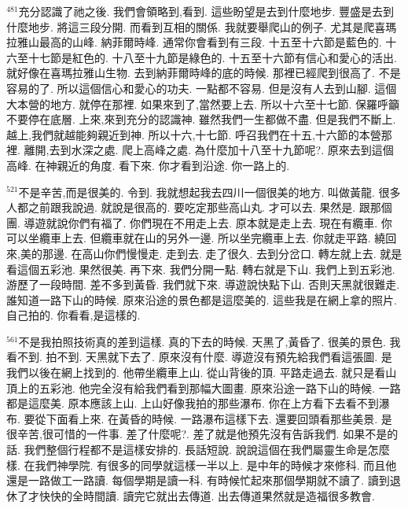\documentclass{book}
\begin{document}
$^{481}$充分認識了祂之後.
我們會領略到,看到.
這些盼望是去到什麼地步.
豐盛是去到什麼地步.
將這三段分開.
而看到互相的關係.
我就要舉爬山的例子.
尤其是爬喜瑪拉雅山最高的山峰.
納菲爾時峰.
通常你會看到有三段.
十五至十六節是藍色的.
十六至十七節是紅色的.
十八至十九節是綠色的.
十五至十六節有信心和愛心的活出.
就好像在喜瑪拉雅山生物.
去到納菲爾時峰的底的時候.
那裡已經爬到很高了.
不是容易的了.
所以這個信心和愛心的功夫.
一點都不容易.
但是沒有人去到山腳.
這個大本營的地方.
就停在那裡.
如果來到了,當然要上去.
所以十六至十七節.
保羅呼籲不要停在底層.
上來,來到充分的認識神.
雖然我們一生都做不盡.
但是我們不斷上.
越上,我們就越能夠親近到神.
所以十六,十七節.
呼召我們在十五,十六節的本營那裡.
離開,去到水深之處.
爬上高峰之處.
為什麼加十八至十九節呢?.
原來去到這個高峰.
在神親近的角度.
看下來.
你才看到沿途.
你一路上的.

$^{521}$不是辛苦,而是很美的.
令到.
我就想起我去四川一個很美的地方.
叫做黃龍.
很多人都之前跟我說過.
就說是很高的.
要吃定那些高山丸.
才可以去.
果然是.
跟那個團.
導遊就說你們有福了.
你們現在不用走上去.
原本就是走上去.
現在有纜車.
你可以坐纜車上去.
但纜車就在山的另外一邊.
所以坐完纜車上去.
你就走平路.
繞回來,美的那邊.
在高山你們慢慢走.
走到去.
走了很久.
去到分岔口.
轉左就上去.
就是看這個五彩池.
果然很美.
再下來.
我們分開一點.
轉右就是下山.
我們上到五彩池.
游歷了一段時間.
差不多到黃昏.
我們就下來.
導遊說快點下山.
否則天黑就很難走.
誰知道一路下山的時候.
原來沿途的景色都是這麼美的.
這些我是在網上拿的照片.
自己拍的.
你看看,是這樣的.

$^{561}$不是我拍照技術真的差到這樣.
真的下去的時候.
天黑了,黃昏了.
很美的景色.
我看不到.
拍不到.
天黑就下去了.
原來沒有什麼.
導遊沒有預先給我們看這張圖.
是我們以後在網上找到的.
他帶坐纜車上山.
從山背後的頂.
平路走過去.
就只是看山頂上的五彩池.
他完全沒有給我們看到那幅大圖畫.
原來沿途一路下山的時候.
一路都是這麼美.
原本應該上山.
上山好像我拍的那些瀑布.
你在上方看下去看不到瀑布.
要從下面看上來.
在黃昏的時候.
一路瀑布這樣下去.
還要回頭看那些美景.
是很辛苦,很可惜的一件事.
差了什麼呢?.
差了就是他預先沒有告訴我們.
如果不是的話.
我們整個行程都不是這樣安排的.
長話短說.
說說這個在我們屬靈生命是怎麼樣.
在我們神學院.
有很多的同學就這樣一半以上.
是中年的時候才來修科.
而且他還是一路做工一路讀.
每個學期是讀一科.
有時候忙起來那個學期就不讀了.
讀到退休了才快快的全時間讀.
讀完它就出去傳道.
出去傳道果然就是造福很多教會.
\end{document}
